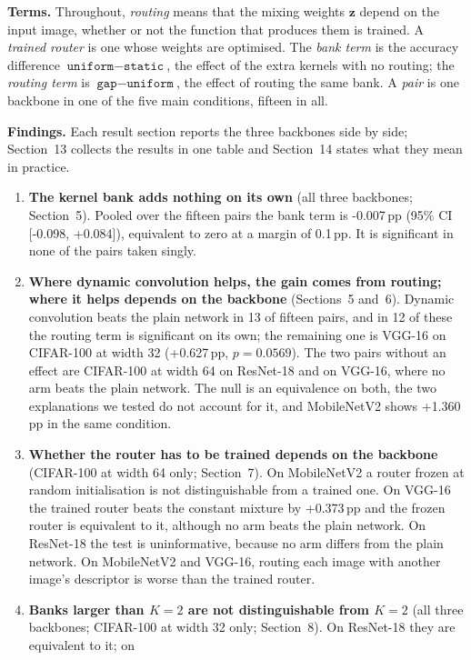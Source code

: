 \documentclass{article}
\begin{document}
\textbf{Terms.}  Throughout, \emph{routing} means that the mixing
weights $\mathbf{z}$ depend on the input image, whether or not the function that
produces them is trained. A \emph{trained router} is one whose weights are
optimised. The \emph{bank term} is the accuracy difference
$\texttt{uniform}-\texttt{static}$, the effect of the extra kernels with
no routing; the \emph{routing term} is $\texttt{gap}-\texttt{uniform}$,
the effect of routing the same bank. A \emph{pair} is one backbone in one
of the five main conditions, fifteen in all.

\textbf{Findings.}  Each result section reports the three backbones side
by side; Section~13 collects the results in one table and
Section~14 states what they mean in practice.
\begin{enumerate}
\item \textbf{The kernel bank adds nothing on its own} (all three
backbones; Section~5). Pooled over the fifteen pairs the bank
term is -0.007\,pp (95\% CI [-0.098,
+0.084]), equivalent to zero at a margin of
0.1\,pp. It is significant in none of the pairs taken
singly.
\item \textbf{Where dynamic convolution helps, the gain comes from
routing; where it helps depends on the backbone} (Sections~5
and~6). Dynamic convolution beats the plain network in
13 of fifteen pairs, and in 12 of these the routing
term is significant on its own; the remaining one is VGG-16 on CIFAR-100
at width 32 (+0.627\,pp, $p=0.0569$). The two pairs without
an effect are CIFAR-100 at width 64 on ResNet-18 and on VGG-16, where no
arm beats the plain network. The null is an equivalence on both, the two
explanations we tested do not account for it, and MobileNetV2 shows
+1.360\,pp in the same condition.
\item \textbf{Whether the router has to be trained depends on the
backbone} (CIFAR-100 at width 64 only; Section~7). On
MobileNetV2 a router frozen at random initialisation is not
distinguishable from a trained one. On VGG-16 the trained router beats
the constant mixture by +0.373\,pp and the frozen router is
equivalent to it, although no arm beats the plain network. On ResNet-18
the test is uninformative, because no arm differs from the plain network.
On MobileNetV2 and VGG-16, routing each image with another image's
descriptor is worse than the trained router.
\item \textbf{Banks larger than $K=2$ are not distinguishable from $K=2$}
(all three backbones; CIFAR-100 at width 32 only;
Section~8). On ResNet-18 they are equivalent to it; on

\end{enumerate}
\end{document}
